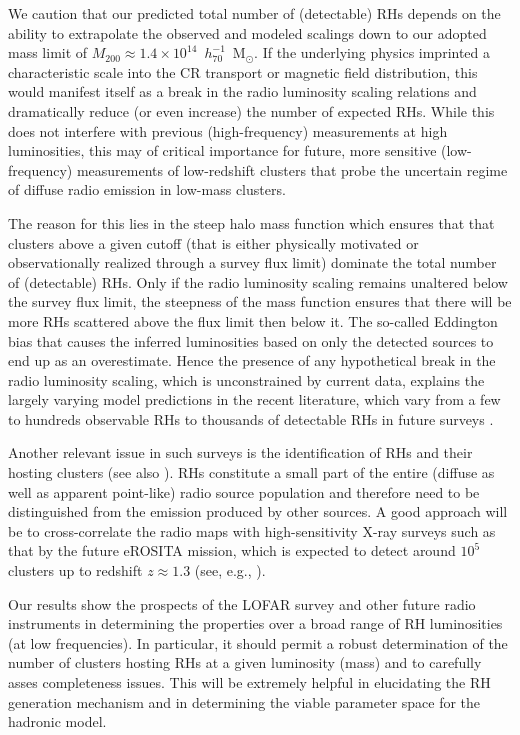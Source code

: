 \documentclass[traditabstract]{aa}
\begin{document}
We caution that our predicted total number of (detectable) RHs depends on the
ability to extrapolate the observed and modeled scalings down to our adopted
mass limit of $M_{200}\approx1.4\times10^{14}$~$h_{70}^{-1}$~M$_{\odot}$. If the
underlying physics imprinted a characteristic scale into the CR transport or
magnetic field distribution, this would manifest itself as a break in the radio
luminosity scaling relations and dramatically reduce (or even increase) the
number of expected RHs.  While this does not interfere with previous
(high-frequency) measurements at high luminosities, this may of critical
importance for future, more sensitive (low-frequency) measurements of
low-redshift clusters that probe the uncertain regime of diffuse radio emission
in low-mass clusters.

The reason for this lies in the steep halo mass function which ensures that that
clusters above a given cutoff (that is either physically motivated or
observationally realized through a survey flux limit) dominate the total number
of (detectable) RHs. Only if the radio luminosity scaling remains unaltered
below the survey flux limit, the steepness of the mass function ensures that
there will be more RHs scattered above the flux limit then below it. The
so-called Eddington bias that causes the inferred luminosities based on only the
detected sources to end up as an overestimate. Hence the presence of any
hypothetical break in the radio luminosity scaling, which is unconstrained by
current data, explains the largely varying model predictions in the recent
literature, which vary from a few to hundreds observable RHs
\citep{2010A&A...509A..68C,2011arXiv1110.2786S} to thousands of detectable RHs
in future surveys \citep{2002A&A...396...83E}.

Another relevant issue in such surveys is the identification of RHs and their
hosting clusters (see also \citealp{2010A&A...509A..68C}). RHs constitute a
small part of the entire (diffuse as well as apparent point-like) radio source
population and therefore need to be distinguished from the emission produced by
other sources. A good approach will be to cross-correlate the radio maps with
high-sensitivity X-ray surveys such as that by the future eROSITA mission, which
is expected to detect around $10^{5}$ clusters up to redshift $z \approx 1.3$
(see, e.g., \citealp{2011MSAIS..17..159C}).

Our results show the prospects of the LOFAR survey and other future radio
instruments in determining the properties over a broad range of RH luminosities
(at low frequencies). In particular, it should permit a robust determination of
the number of clusters hosting RHs at a given luminosity (mass) and to carefully
asses completeness issues. This will be extremely helpful in elucidating the RH
generation mechanism and in determining the viable parameter space for the
hadronic model.
\end{document}
